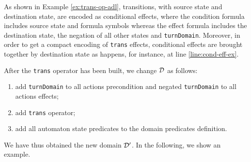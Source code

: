 As shown in Example \ref{ex:trans-op-adl}, transitions, with source state and destination state, are encoded as conditional effects, where the condition formula includes source state and formula symbols whereas the effect formula includes the destination state, the negation of all other states and \texttt{turnDomain}. Moreover, in order to get a compact encoding of \texttt{trans} effects, conditional effects are brought together by destination state as happens, for instance, at line \ref{line:cond-eff-ex}.

After the \texttt{trans} operator has been built, we change $\mathcal{D}$ as follows:
\begin{enumerate}
\item add \texttt{turnDomain} to all actions precondition and negated \texttt{turnDomain} to all actions effects;
\item add \texttt{trans} operator;
\item add all automaton state predicates to the domain predicates definition.
\end{enumerate}

\noindent We have thus obtained the new domain $\mathcal{D}'$. In the following, we show an example.

